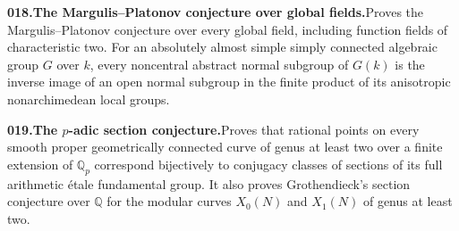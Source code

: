 \documentclass[11pt,a4paper]{article}
\begin{document}
  \par \begin{minipage}{\linewidth}
  \fontsize{10.5}{12.6}\selectfont\RaggedRight
  \hypertarget{result 018}{}
  {\bfseries\textcolor{muted}{018.}\enspace The Margulis--Platonov conjecture over global fields.}\enspace Proves the Margulis--Platonov conjecture over every global field, including function fields of characteristic two. For an absolutely almost simple simply connected algebraic group $G$ over $k$, every noncentral abstract normal subgroup of $G(k)$ is the inverse image of an open normal subgroup in the finite product of its anisotropic nonarchimedean local groups.\par
  \end{minipage}\par\vspace{5pt}



  \par \begin{minipage}{\linewidth}
  \fontsize{10.5}{12.6}\selectfont\RaggedRight
  \hypertarget{result 019}{}
  {\bfseries\textcolor{muted}{019.}\enspace The $p$-adic section conjecture.}\enspace Proves that rational points on every smooth proper geometrically connected curve of genus at least two over a finite extension of $\mathbb Q_p$ correspond bijectively to conjugacy classes of sections of its full arithmetic \'etale fundamental group. It also proves Grothendieck's section conjecture over $\mathbb Q$ for the modular curves $X_0(N)$ and $X_1(N)$ of genus at least two.\par
  \end{minipage}\par\vspace{5pt}
\end{document}
